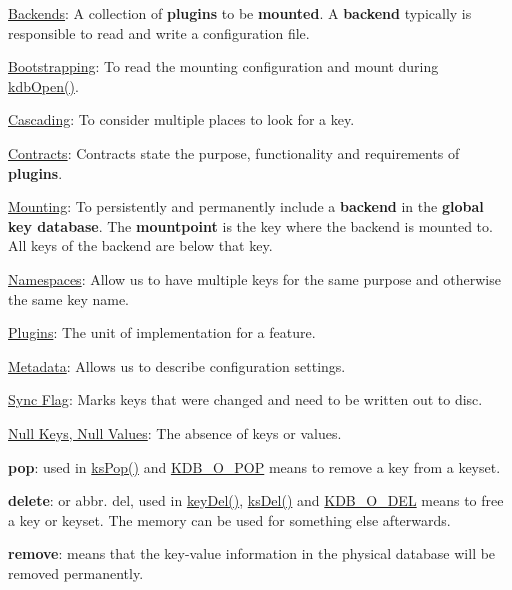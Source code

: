 \begin{DoxyItemize}
\item \hyperlink{doc_help_elektra-backends_md}{Backends}\+: A collection of {\bfseries plugins} to be {\bfseries mounted}. A {\bfseries backend} typically is responsible to read and write a configuration file.
\item \hyperlink{doc_help_elektra-bootstrapping_md}{Bootstrapping}\+: To read the mounting configuration and mount during {\ttfamily \hyperlink{group__kdb_ga6808defe5870f328dd17910aacbdc6ca}{kdb\+Open()}}.
\item \hyperlink{doc_help_elektra-cascading_md}{Cascading}\+: To consider multiple places to look for a key.
\item \hyperlink{doc_help_elektra-contracts_md}{Contracts}\+: Contracts state the purpose, functionality and requirements of {\bfseries plugins}.
\item \hyperlink{doc_help_elektra-mounting_md}{Mounting}\+: To persistently and permanently include a {\bfseries backend} in the {\bfseries global key database}. The {\bfseries mountpoint} is the key where the backend is mounted to. All keys of the backend are below that key.
\item \hyperlink{doc_help_elektra-namespaces_md}{Namespaces}\+: Allow us to have multiple keys for the same purpose and otherwise the same key name.
\item \hyperlink{src_plugins_README_md}{Plugins}\+: The unit of implementation for a feature.
\item \hyperlink{doc_help_elektra-metadata_md}{Metadata}\+: Allows us to describe configuration settings.
\end{DoxyItemize}


\begin{DoxyItemize}
\item \hyperlink{doc_help_elektra-sync-flag_md}{Sync Flag}\+: Marks keys that were changed and need to be written out to disc.
\item \hyperlink{doc_help_elektra-values_md}{Null Keys, Null Values}\+: The absence of keys or values.
\item {\bfseries pop}\+: used in {\ttfamily \hyperlink{group__keyset_gae42530b04defb772059de0600159cf69}{ks\+Pop()}} and \hyperlink{group__keyset_ggada05f4bbf46fde81d0d57df86e73d914a52fb5f2cc86773d393da62bebebf7984}{K\+D\+B\+\_\+\+O\+\_\+\+P\+OP} means to remove a key from a keyset.
\item {\bfseries delete}\+: or abbr. del, used in {\ttfamily \hyperlink{group__key_ga3df95bbc2494e3e6703ece5639be5bb1}{key\+Del()}}, {\ttfamily \hyperlink{group__keyset_ga27e5c16473b02a422238c8d970db7ac8}{ks\+Del()}} and \hyperlink{group__keyset_ggada05f4bbf46fde81d0d57df86e73d914a66a5380c120f25f28f49848c4a863ead}{K\+D\+B\+\_\+\+O\+\_\+\+D\+EL} means to free a key or keyset. The memory can be used for something else afterwards.
\item {\bfseries remove}\+: means that the key-\/value information in the physical database will be removed permanently. 
\end{DoxyItemize}